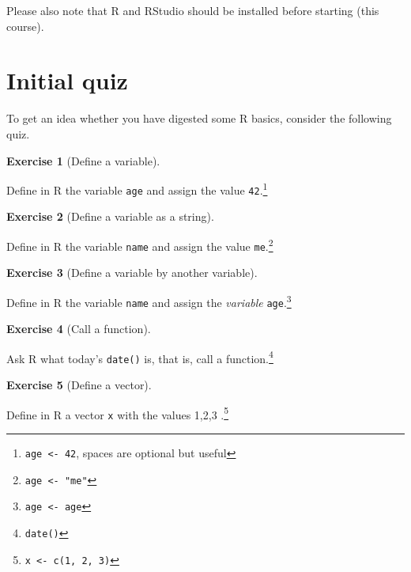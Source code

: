 \documentclass[
  letterpaper,
  DIV=11,
  numbers=noendperiod]{scrreprt}
\theoremstyle{definition}
\newtheorem{exercise}{Exercise}[chapter]
\theoremstyle{definition}
\theoremstyle{remark}
\begin{document}
Please also note that R and RStudio should be installed before starting
(this course).

\hypertarget{initial-quiz}{%
\section{Initial quiz}\label{initial-quiz}}

To get an idea whether you have digested some R basics, consider the
following quiz.

\leavevmode{}%
\begin{exercise}[Define a variable]\label{exr-q1}

Define in R the variable \texttt{age} and assign the value
\texttt{42}.\footnote{\texttt{age\ \textless{}-\ 42}, spaces are
  optional but useful}

\end{exercise}

\leavevmode{}%
\begin{exercise}[Define a variable as a string]\label{exr-q2}

Define in R the variable \texttt{name} and assign the value
\texttt{me}.\footnote{\texttt{age\ \textless{}-\ "me"}}

\end{exercise}

\leavevmode{}%
\begin{exercise}[Define a variable by another variable]\label{exr-q3}

Define in R the variable \texttt{name} and assign the \emph{variable}
\texttt{age}.\footnote{\texttt{age\ \textless{}-\ age}}

\end{exercise}

\leavevmode{}%
\begin{exercise}[Call a function]\label{exr-q3a}

Ask R what today's \texttt{date()} is, that is, call a
function.\footnote{\texttt{date()}}

\end{exercise}

\leavevmode{}%
\begin{exercise}[Define a vector]\label{exr-q4}

Define in R a vector \texttt{x} with the values 1,2,3 .\footnote{\texttt{x\ \textless{}-\ c(1,\ 2,\ 3)}}

\end{exercise}
\end{document}
